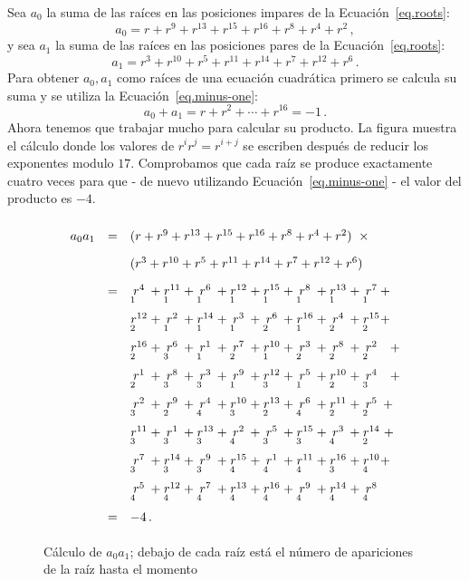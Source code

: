 Sea $a_0$ la suma de las raíces en las posiciones impares de la Ecuación~\ref{eq.roots}:
\[
a_0=r + r^9 + r^{13} +r^{15} +r^{16} + r^8+r^4+r^2\,,
\]
y sea $a_1$ la suma de las raíces en las posiciones pares de la Ecuación~\ref{eq.roots}:
\[
a_1=r^3 + r^{10} + r^{5} +r^{11} +r^{14} + r^7+r^{12}+r^6\,.
\]
Para obtener $a_0,a_1$ como raíces de una ecuación cuadrática primero se calcula su suma y se utiliza la Ecuación~\ref{eq.minus-one}:
\[
a_0+a_1=r + r^2 + \cdots +r^{16}=-1\,.
\]
Ahora tenemos que trabajar mucho para calcular su producto. La figura muestra el cálculo donde los valores de $r^ir^j=r^{i+j}$ se escriben después de reducir los exponentes modulo $17$. Comprobamos que cada raíz se produce exactamente cuatro veces para que - de nuevo utilizando Ecuación~\ref{eq.minus-one} - el valor del producto es $-4$.

\begin{figure}[t]
\[
\renewcommand{\arraystretch}{1.8}
\begin{array}{lcl}
a_0a_1&=&(r + r^9 + r^{13} +r^{15} +r^{16} + r^8+r^4+r^2)\;\;\times\\
&&(r^3 + r^{10} + r^{5} +r^{11} +r^{14} + r^7+r^{12}+r^6)\\
&=&\occ{4}{1} + \occ{11}{1} + \occ{6}{1} + \occ{12}{1} + \occ{15}{1} + \occ{8}{1} + \occ{13}{1} + \occ{7}{1} +\\
&&\occ{12}{2} + \occ{2}{1} + \occ{14}{1} + \occ{3}{1} + \occ{6}{2} + \occ{16}{1} + \occ{4}{2} + \occ{15}{2} +\\
&&\occ{16}{2} + \occ{6}{3} + \occ{1}{1} + \occ{7}{2} + \occ{10}{1} + \occ{3}{2} + \occ{8}{2} + \occ{2}{2}\;\;\: +\\
&&\occ{1}{2} + \occ{8}{3} + \occ{3}{3} + \occ{9}{1} + \occ{12}{3} + \occ{5}{1} + \occ{10}{2} + \occ{4}{3}\;\;\: +\\
&&\occ{2}{3} + \occ{9}{2} + \occ{4}{4} + \occ{10}{3} + \occ{13}{2} + \occ{6}{4} + \occ{11}{2} + \occ{5}{2} \:+\\
&&\occ{11}{3} + \occ{1}{3} + \occ{13}{3} + \occ{2}{4} + \occ{5}{3} + \occ{15}{3} + \occ{3}{4} + \occ{14}{2} \;+\\
&&\occ{7}{3} + \occ{14}{3} + \occ{9}{3} + \occ{15}{4} + \occ{1}{4} + \occ{11}{4} + \occ{16}{3} + \occ{10}{4} +\\
&&\occ{5}{4} + \occ{12}{4} + \occ{7}{4} + \occ{13}{4} + \occ{16}{4} + \occ{9}{4} + \occ{14}{4} + \occ{8}{4}\\
&=&-4\,.
\end{array}
\]
\caption{Cálculo de $a_0a_1$; debajo de cada raíz está el número de apariciones de la raíz hasta el momento}\label{fig.a0a1}
\end{figure}

